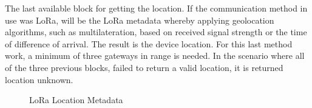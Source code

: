 
The last available block for getting the location. If the communication method in use was LoRa, will be the LoRa metadata whereby applying geolocation algorithms, such as multilateration, based on received signal strength or the time of difference of arrival. The result is the device location. For this last method work, a minimum of three gateways in range is needed. In the scenario where all of the three previous
blocks, failed to  return a valid location, it is returned location unknown.\newline


\begin{figure}[htbp]
  \centering
  \caption{LoRa Location Metadata}
  \label{fig:LoRa_Metadata}
\end{figure}


\newpage

